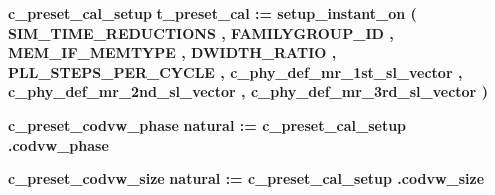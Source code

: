 \begin{DoxyCompactItemize}
{\bf c\+\_\+preset\+\_\+cal\+\_\+setup} {\bfseries \textcolor{vhdlchar}{t\+\_\+preset\+\_\+cal}\textcolor{vhdlchar}{ }\textcolor{vhdlchar}{ }\textcolor{vhdlchar}{\+:}\textcolor{vhdlchar}{=}\textcolor{vhdlchar}{ }\textcolor{vhdlchar}{ }\textcolor{vhdlchar}{ }\textcolor{vhdlchar}{ }\textcolor{vhdlchar}{setup\+\_\+instant\+\_\+on}\textcolor{vhdlchar}{ }\textcolor{vhdlchar}{(}\textcolor{vhdlchar}{ }\textcolor{vhdlchar}{ }\textcolor{vhdlchar}{ }\textcolor{vhdlchar}{ }{\bfseries {\bf S\+I\+M\+\_\+\+T\+I\+M\+E\+\_\+\+R\+E\+D\+U\+C\+T\+I\+O\+NS}} \textcolor{vhdlchar}{ }\textcolor{vhdlchar}{,}\textcolor{vhdlchar}{ }\textcolor{vhdlchar}{ }\textcolor{vhdlchar}{ }\textcolor{vhdlchar}{ }{\bfseries {\bf F\+A\+M\+I\+L\+Y\+G\+R\+O\+U\+P\+\_\+\+ID}} \textcolor{vhdlchar}{ }\textcolor{vhdlchar}{,}\textcolor{vhdlchar}{ }\textcolor{vhdlchar}{ }\textcolor{vhdlchar}{ }\textcolor{vhdlchar}{ }{\bfseries {\bf M\+E\+M\+\_\+\+I\+F\+\_\+\+M\+E\+M\+T\+Y\+PE}} \textcolor{vhdlchar}{ }\textcolor{vhdlchar}{,}\textcolor{vhdlchar}{ }\textcolor{vhdlchar}{ }\textcolor{vhdlchar}{ }\textcolor{vhdlchar}{ }{\bfseries {\bf D\+W\+I\+D\+T\+H\+\_\+\+R\+A\+T\+IO}} \textcolor{vhdlchar}{ }\textcolor{vhdlchar}{,}\textcolor{vhdlchar}{ }\textcolor{vhdlchar}{ }\textcolor{vhdlchar}{ }\textcolor{vhdlchar}{ }{\bfseries {\bf P\+L\+L\+\_\+\+S\+T\+E\+P\+S\+\_\+\+P\+E\+R\+\_\+\+C\+Y\+C\+LE}} \textcolor{vhdlchar}{ }\textcolor{vhdlchar}{,}\textcolor{vhdlchar}{ }\textcolor{vhdlchar}{ }\textcolor{vhdlchar}{ }\textcolor{vhdlchar}{ }{\bfseries {\bf c\+\_\+phy\+\_\+def\+\_\+mr\+\_\+1st\+\_\+sl\+\_\+vector}} \textcolor{vhdlchar}{ }\textcolor{vhdlchar}{,}\textcolor{vhdlchar}{ }\textcolor{vhdlchar}{ }\textcolor{vhdlchar}{ }\textcolor{vhdlchar}{ }{\bfseries {\bf c\+\_\+phy\+\_\+def\+\_\+mr\+\_\+2nd\+\_\+sl\+\_\+vector}} \textcolor{vhdlchar}{ }\textcolor{vhdlchar}{,}\textcolor{vhdlchar}{ }\textcolor{vhdlchar}{ }\textcolor{vhdlchar}{ }\textcolor{vhdlchar}{ }{\bfseries {\bf c\+\_\+phy\+\_\+def\+\_\+mr\+\_\+3rd\+\_\+sl\+\_\+vector}} \textcolor{vhdlchar}{ }\textcolor{vhdlchar}{)}\textcolor{vhdlchar}{ }} 
\item 
{\bf c\+\_\+preset\+\_\+codvw\+\_\+phase} {\bfseries \textcolor{comment}{natural}\textcolor{vhdlchar}{ }\textcolor{vhdlchar}{ }\textcolor{vhdlchar}{\+:}\textcolor{vhdlchar}{=}\textcolor{vhdlchar}{ }\textcolor{vhdlchar}{ }\textcolor{vhdlchar}{ }\textcolor{vhdlchar}{ }{\bfseries {\bf c\+\_\+preset\+\_\+cal\+\_\+setup}} \textcolor{vhdlchar}{.}\textcolor{vhdlchar}{codvw\+\_\+phase}\textcolor{vhdlchar}{ }} 
\item 
{\bf c\+\_\+preset\+\_\+codvw\+\_\+size} {\bfseries \textcolor{comment}{natural}\textcolor{vhdlchar}{ }\textcolor{vhdlchar}{ }\textcolor{vhdlchar}{\+:}\textcolor{vhdlchar}{=}\textcolor{vhdlchar}{ }\textcolor{vhdlchar}{ }\textcolor{vhdlchar}{ }\textcolor{vhdlchar}{ }{\bfseries {\bf c\+\_\+preset\+\_\+cal\+\_\+setup}} \textcolor{vhdlchar}{.}\textcolor{vhdlchar}{codvw\+\_\+size}\textcolor{vhdlchar}{ }} 

\end{DoxyCompactItemize}
